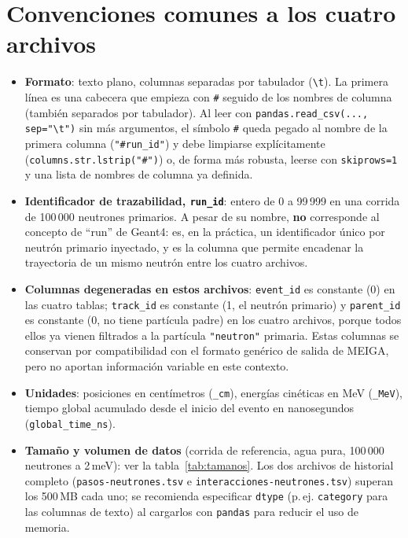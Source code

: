 \documentclass[11pt,a4paper]{article}
\newcommand{\codigo}[1]{\nolinkurl{#1}}
\newcommand{\archivo}[1]{\texttt{#1}} %
\newcommand{\var}[1]{\texttt{#1}}
\begin{document}
\section{Convenciones comunes a los cuatro archivos}
\label{sec:convenciones}

\begin{itemize}
  \item \textbf{Formato}: texto plano, columnas separadas por tabulador (\texttt{\textbackslash t}).
  La primera línea es una cabecera que empieza con \texttt{\#} seguido de los nombres de columna
  (también separados por tabulador). Al leer con \texttt{pandas.read\_csv(..., sep="\textbackslash t")}
  sin más argumentos, el símbolo \texttt{\#} queda pegado al nombre de la primera columna
  (\texttt{"\#run\_id"}) y debe limpiarse explícitamente (\codigo{columns.str.lstrip("\#")}) o, de
  forma más robusta, leerse con \codigo{skiprows=1} y una lista de nombres de columna ya definida.
  \item \textbf{Identificador de trazabilidad, \var{run\_id}}: entero de 0 a 99\,999 en una corrida
  de 100\,000 neutrones primarios. A pesar de su nombre, \textbf{no} corresponde al concepto de
  ``run'' de Geant4: es, en la práctica, un identificador único por neutrón primario inyectado, y es
  la columna que permite encadenar la trayectoria de un mismo neutrón entre los cuatro archivos.
  \item \textbf{Columnas degeneradas en estos archivos}: \var{event\_id} es constante (0) en las
  cuatro tablas; \var{track\_id} es constante (1, el neutrón primario) y \var{parent\_id} es
  constante (0, no tiene partícula padre) en los cuatro archivos, porque todos ellos ya vienen
  filtrados a la partícula \var{"neutron"} primaria. Estas columnas se conservan por compatibilidad
  con el formato genérico de salida de MEIGA, pero no aportan información variable en este contexto.
  \item \textbf{Unidades}: posiciones en centímetros (\var{\_cm}), energías cinéticas en MeV
  (\var{\_MeV}), tiempo global acumulado desde el inicio del evento en nanosegundos
  (\var{global\_time\_ns}).
  \item \textbf{Tamaño y volumen de datos} (corrida de referencia, agua pura, 100\,000 neutrones a
  2\,meV): ver la tabla~\ref{tab:tamanos}. Los dos archivos de historial completo
  (\archivo{pasos-neutrones.tsv} e \archivo{interacciones-neutrones.tsv}) superan los 500\,MB cada
  uno; se recomienda especificar \codigo{dtype} (p.\,ej. \codigo{category} para las columnas de
  texto) al cargarlos con \codigo{pandas} para reducir el uso de memoria.
\end{itemize}
\end{document}
